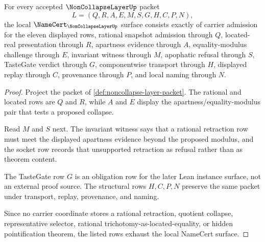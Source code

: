 \begin{theorem}
\label{thm:noncollapse-layer-namecert-obligations}
For every accepted $\NonCollapseLayerUp$ packet
$$
L=(Q,R,A,E,M,S,G,H,C,P,N),
$$
the local $\NameCert_{\NonCollapseLayerUp}$ surface consists exactly of carrier admission for the eleven displayed rows, rational snapshot admission through $Q$, located-real presentation through $R$, apartness evidence through $A$, equality-modulus challenge through $E$, invariant witness through $M$, apophatic refusal through $S$, TasteGate verdict through $G$, componentwise transport through $H$, displayed replay through $C$, provenance through $P$, and local naming through $N$.
\end{theorem}
\begin{proof}
Project the packet of \autoref{def:noncollapse-layer-packet}. The rational and located rows are $Q$ and $R$, while $A$ and $E$ display the apartness/equality-modulus pair that tests a proposed collapse.

Read $M$ and $S$ next. The invariant witness says that a rational retraction row must meet the displayed apartness evidence beyond the proposed modulus, and the socket row records that unsupported retraction as refusal rather than as theorem content.

The TasteGate row $G$ is an obligation row for the later Lean instance surface, not an external proof source. The structural rows $H,C,P,N$ preserve the same packet under transport, replay, provenance, and naming.

Since no carrier coordinate stores a rational retraction, quotient collapse, representative selector, rational trichotomy-as-located-equality, or hidden pointification theorem, the listed rows exhaust the local NameCert surface.
\end{proof}

